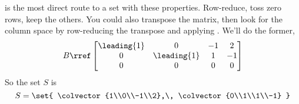  is the most direct route to a set with these properties.  Row-reduce, toss zero rows, keep the others.  You could also transpose the matrix, then look for the column space by row-reducing the transpose and applying .  We'll do the former,
%
\begin{equation*}
B\rref
\begin{bmatrix}
\leading{1} & 0 & -1 & 2\\
0 & \leading{1} & 1 & -1\\
0 & 0 & 0 & 0
\end{bmatrix}
\end{equation*}
%
So the set $S$ is 
%
\begin{equation*}
S=\set{
\colvector{1\\0\\-1\\2},\,
\colvector{0\\1\\1\\-1}
}
\end{equation*}
%